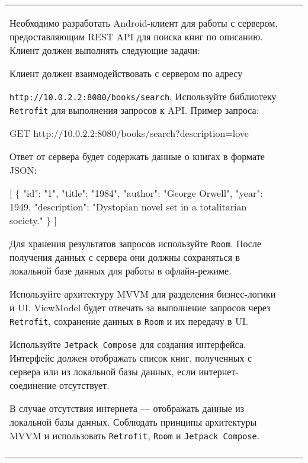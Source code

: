 \documentclass[a4paper]{article}
\begin{document}
\begin{tabular}{!{\vrule width 2pt}p{5cm}|p{6cm}|p{4cm}!{\vrule width 2pt}}
{\begin{minipage}{16cm}
\begin{enumerate}
Необходимо разработать Android-клиент для работы с сервером, предоставляющим REST API для поиска книг по описанию. Клиент должен выполнять следующие задачи:

Клиент должен взаимодействовать с сервером по адресу 

\texttt{http://10.0.2.2:8080/books/search}. Используйте библиотеку \texttt{Retrofit} для выполнения запросов к API. Пример запроса:


GET http://10.0.2.2:8080/books/search?description=love


Ответ от сервера будет содержать данные о книгах в формате JSON:


[
  \{
    "id": "1",
    "title": "1984",
    "author": "George Orwell",
    "year": 1949,
    "description": "Dystopian novel set in a totalitarian society."
  \}
]


Для хранения результатов запросов используйте \texttt{Room}. После получения данных с сервера они должны сохраняться в локальной базе данных для работы в офлайн-режиме.

Используйте архитектуру MVVM для разделения бизнес-логики и UI. ViewModel будет отвечать за выполнение запросов через \texttt{Retrofit}, сохранение данных в \texttt{Room} и их передачу в UI.

Используйте \texttt{Jetpack Compose} для создания интерфейса. Интерфейс должен отображать список книг, полученных с сервера или из локальной базы данных, если интернет-соединение отсутствует.

В случае отсутствия интернета — отображать данные из локальной базы данных.
Соблюдать принципы архитектуры MVVM и использовать \texttt{Retrofit}, \texttt{Room} и \texttt{Jetpack Compose}. 
\end{enumerate}

\vspace{0.2cm}
    
\end{minipage}
}
\\
\end{tabular}
\end{document}
